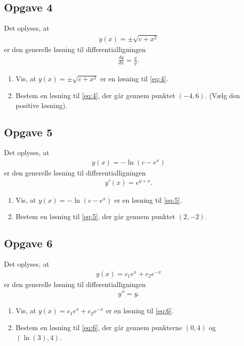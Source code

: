 \subsection*{Opgave 4}
	Det oplyses, at 
	\begin{align*}
		y(x) = \pm\sqrt{c+x^2}
	\end{align*}
	er den generelle løsning til differentialligningen
	\begin{align}\label{eq:4}
		\frac{d y}{d x} = \frac{x}{y}.
	\end{align}
\begin{enumerate}[label=\roman*)]
\item Vis, at $y(x) = \pm\sqrt{c+x^2}$ er en løsning til \eqref{eq:4}.
\item Bestem en løsning til \eqref{eq:4}, der går gennem punktet $(-4,6)$. (Vælg den positive løsning).
\end{enumerate}


\subsection*{Opgave 5}
	Det oplyses, at 
	\begin{align*}
		y(x) = -\ln(c-e^x)
	\end{align*}
	er den generelle løsning til differentialligningen
	\begin{align}\label{eq:5}
		y'(x) = e^{y+x}.
	\end{align}
\begin{enumerate}[label=\roman*)]
\item Vis, at $y(x) = -\ln(c-e^x)$ er en løsning til \eqref{eq:5}.
\item Bestem en løsning til \eqref{eq:5}, der går gennem punktet $(2,-2)$. 
\end{enumerate}

\subsection*{Opgave 6}

	Det oplyses, at 
	\begin{align*}
		y(x) = c_1e^x+c_2e^{-x}
	\end{align*}
	er den generelle løsning til differentialligningen
	\begin{align}\label{eq:6}
		y'' = y.
	\end{align}
\begin{enumerate}[label=\roman*)]
\item Vis, at $y(x) = c_1e^x+c_2e^{-x}$ er en løsning til \eqref{eq:6}.
\item Bestem en løsning til \eqref{eq:6}, der går gennem punkterne $(0,4)$ og 
$\left(\ln(3), 4\right)$.
\end{enumerate}

